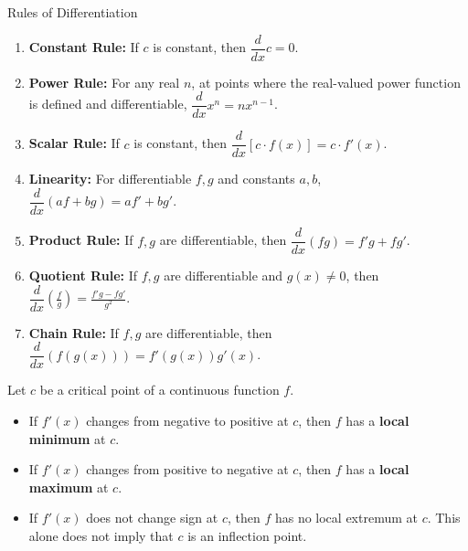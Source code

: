 \begin{theorem}{Rules of Differentiation}

    \begin{enumerate}
        \item \textbf{Constant Rule:} If $c$ is constant, then $\dfrac{d}{dx}c=0$. \vspace{0.5em}
        \item \textbf{Power Rule:} For any real $n$, at points where the real-valued power function is defined and differentiable, $\dfrac{d}{dx}x^n = n x^{n-1}$. \vspace{0.5em}
        \item \textbf{Scalar Rule:} If $c$ is constant, then $\dfrac{d}{dx}[c \cdot f(x)] = c \cdot f'(x)$. \vspace{0.5em}
        \item \textbf{Linearity:} For differentiable $f,g$ and constants $a,b$, $\dfrac{d}{dx}(a f + b g) = a f' + b g'$. \vspace{0.5em}
        \item \textbf{Product Rule:} If $f,g$ are differentiable, then $\dfrac{d}{dx}(f g) = f'g + fg'$. \vspace{0.5em}
        \item \textbf{Quotient Rule:} If $f,g$ are differentiable and $g(x)\neq0$, then $\dfrac{d}{dx}\left(\frac{f}{g}\right) = \frac{f'g - fg'}{g^2}$. \vspace{0.5em}
        \item \textbf{Chain Rule:} If $f,g$ are differentiable, then $\dfrac{d}{dx}(f(g(x))) = f'(g(x))g'(x)$. \vspace{0.5em}
    \end{enumerate}

\end{theorem}

\begin{theorem}
    Let \(c\) be a critical point of a continuous function \(f\).
    \begin{itemize}
        \item If \(f'(x)\) changes from negative to positive at \(c\), then \(f\) has a \textbf{local minimum} at \(c\).
        \item If \(f'(x)\) changes from positive to negative at \(c\), then \(f\) has a \textbf{local maximum} at \(c\).
        \item If \(f'(x)\) does not change sign at \(c\), then \(f\) has no local extremum at \(c\). This alone does not imply that $c$ is an inflection point.
    \end{itemize}

\end{theorem}

